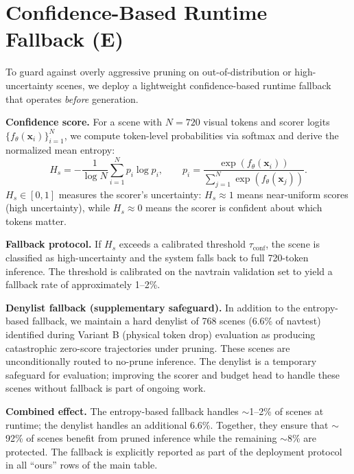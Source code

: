 \documentclass[letterpaper]{article}
\begin{document}
\section{Confidence-Based Runtime Fallback (E)}
\label{sec:fallback}

To guard against overly aggressive pruning on out-of-distribution or high-uncertainty scenes, we
deploy a lightweight confidence-based runtime fallback that operates \emph{before} generation.

\textbf{Confidence score.} For a scene with $N{=}720$ visual tokens and scorer logits
$\{f_\theta(\mathbf{x}_i)\}_{i=1}^{N}$, we compute token-level probabilities via softmax and derive
the normalized mean entropy:
\begin{equation}
H_s = -\frac{1}{\log N}\sum_{i=1}^{N} p_i\log p_i,\qquad
p_i = \frac{\exp(f_\theta(\mathbf{x}_i))}{\sum_{j=1}^{N}\exp(f_\theta(\mathbf{x}_j))}.
\end{equation}
$H_s \in [0,1]$ measures the scorer's uncertainty: $H_s \approx 1$ means near-uniform scores (high
uncertainty), while $H_s \approx 0$ means the scorer is confident about which tokens matter.

\textbf{Fallback protocol.} If $H_s$ exceeds a calibrated threshold $\tau_{\mathrm{conf}}$, the
scene is classified as high-uncertainty and the system falls back to full 720-token inference. The
threshold is calibrated on the navtrain validation set to yield a fallback rate of approximately
1--2\%.

\textbf{Denylist fallback (supplementary safeguard).} In addition to the entropy-based fallback, we
maintain a hard denylist of 768 scenes (6.6\% of navtest) identified during Variant B (physical
token drop) evaluation as producing catastrophic zero-score trajectories under pruning. These scenes
are unconditionally routed to no-prune inference. The denylist is a temporary safeguard for
evaluation; improving the scorer and budget head to handle these scenes without fallback is part of
ongoing work.

\textbf{Combined effect.} The entropy-based fallback handles $\sim$1--2\% of scenes at runtime; the
denylist handles an additional 6.6\%. Together, they ensure that $\sim$92\% of scenes benefit from
pruned inference while the remaining $\sim$8\% are protected. The fallback is explicitly reported as
part of the deployment protocol in all ``ours'' rows of the main table.

\end{document}
